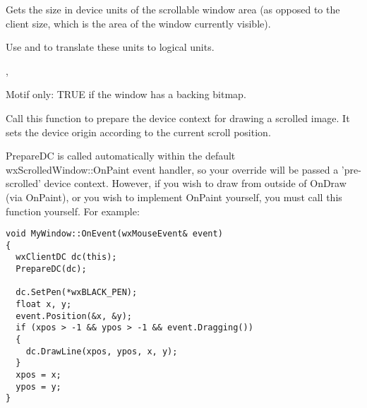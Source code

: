 \label{wxscrolledwindowgetvirtualsize}


Gets the size in device units of the scrollable window area (as
opposed to the client size, which is the area of the window currently
visible).





Use  and \rtfsp
to translate these units to logical units.


,\rtfsp
{}


\label{wxscrolledwindowisretained}


Motif only: TRUE if the window has a backing bitmap.

\label{wxscrolledwindowpreparedc}


Call this function to prepare the device context for drawing a scrolled image. It
sets the device origin according to the current scroll position.

PrepareDC is called automatically within the default wxScrolledWindow::OnPaint event
handler, so your  override
will be passed a 'pre-scrolled' device context. However, if you wish to draw from
outside of OnDraw (via OnPaint), or you wish to implement OnPaint yourself, you must
call this function yourself. For example:

\begin{verbatim}
void MyWindow::OnEvent(wxMouseEvent& event)
{
  wxClientDC dc(this);
  PrepareDC(dc);

  dc.SetPen(*wxBLACK_PEN);
  float x, y;
  event.Position(&x, &y);
  if (xpos > -1 && ypos > -1 && event.Dragging())
  {
    dc.DrawLine(xpos, ypos, x, y);
  }
  xpos = x;
  ypos = y;
}
\end{verbatim}

